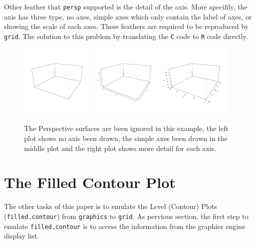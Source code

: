 \documentclass[paper=a4, fontsize=11pt]{report}
\begin{document}
Other feather that \texttt{persp} supported is the detail of the axis. More specifily, the axis has three type, no axes, simple axes which only contain the label of axes, or showing the scale of each axes. These feathers are required to be reproduced by \texttt{grid}, The solution to this problem by translating the \texttt{C} code to \texttt{R} code directly.



\begin{figure}[h]
\begin{center}
  \includegraphics[height = 3.5cm, width = 3.5cm]{figure/axis_example_1.pdf}
  \includegraphics[height = 3.5cm, width = 3.5cm]{figure/axis_example_2.pdf}
  \includegraphics[height = 3.5cm, width = 3.5cm]{figure/axis_example_3.pdf}
  \caption{The Perspective surfaces are been ignored in this example, the left plot shows no axis been drawn, the simple axes been drawn in the middle plot and the right plot shows more detail for each axis.}
  	\label{figure8}
\end{center}
\end{figure}

\section{The Filled Contour Plot}
The other tasks of this paper is to emulate the Level (Contour) Plots (\texttt{filled.contour}) from \texttt{graphics} to \texttt{grid}. As pervious section, the first step to emulate \texttt{filled.contour} is to access the information from the graphics engine display list. \\
\end{document}
